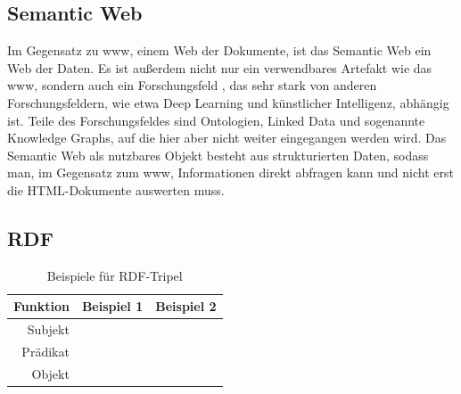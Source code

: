 \subsection{Semantic Web}
Im Gegensatz zu \ac{www}, einem Web der Dokumente, ist das Semantic Web ein Web der Daten.
Es ist außerdem nicht nur ein verwendbares Artefakt wie das \ac{www}, sondern auch ein Forschungsfeld \citep{semanticwebreview}, das sehr stark von anderen Forschungsfeldern, wie etwa Deep Learning und künstlicher Intelligenz, abhängig ist. Teile des Forschungsfeldes sind Ontologien, Linked Data und sogenannte Knowledge Graphs, auf die hier aber nicht weiter eingegangen werden wird.
Das Semantic Web als nutzbares Objekt besteht aus strukturierten Daten, sodass man, im Gegensatz zum \ac{www}, Informationen direkt abfragen kann und nicht erst die HTML-Dokumente auswerten muss.
\subsection{RDF}
\begin{table}[h]\centering\scriptsize
  \begin{tabulary}{\textwidth}{rrl}
    \toprule
    Funktion & Beispiel 1 & Beispiel 2 \\
    \midrule
    Subjekt &  &  \\
    Prädikat &  &  \\
    Objekt &  &  \\
    \bottomrule
  \end{tabulary}
  \caption{Beispiele für RDF-Tripel}
  \label{tab:rdftripleexample}
\end{table}


